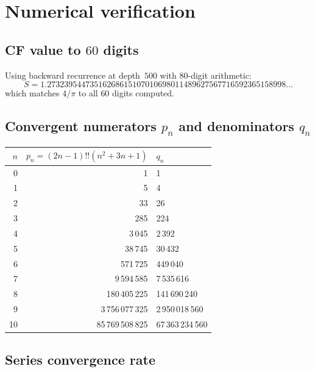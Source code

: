 \documentclass[11pt]{article}
\newcommand{\dff}[1]{(#1)!!}
\theoremstyle{remark}
\begin{document}
\section{Numerical verification}\label{sec:numerical}

\subsection{CF value to $60$ digits}

Using backward recurrence at depth~$500$ with $80$-digit arithmetic:
\[
  S = 1.27323954473516268615107010698011489627567716592365158998\ldots
\]
which matches $4/\pi$ to all $60$ digits computed.

\subsection{Convergent numerators $p_n$ and denominators $q_n$}

\begin{center}
\begin{tabular}{@{}rrl@{}}
  \toprule
  $n$ & $p_n = \dff{2n{-}1}(n^2{+}3n{+}1)$ & $q_n$ \\
  \midrule
  0 & 1 & 1 \\
  1 & 5 & 4 \\
  2 & 33 & 26 \\
  3 & 285 & 224 \\
  4 & 3\,045 & 2\,392 \\
  5 & 38\,745 & 30\,432 \\
  6 & 571\,725 & 449\,040 \\
  7 & 9\,594\,585 & 7\,535\,616 \\
  8 & 180\,405\,225 & 141\,690\,240 \\
  9 & 3\,756\,077\,325 & 2\,950\,018\,560 \\
  10 & 85\,769\,508\,825 & 67\,363\,234\,560 \\
  \bottomrule
\end{tabular}
\end{center}

\subsection{Series convergence rate}
\end{document}
